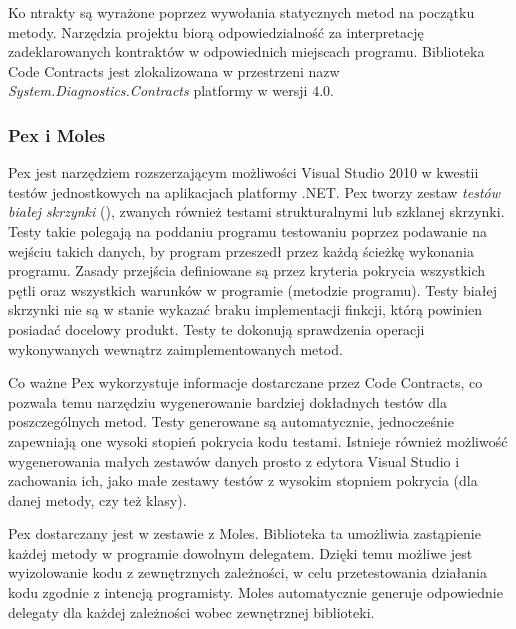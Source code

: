 Ko ntrakty są wyrażone poprzez wywołania statycznych metod na początku metody. Narzędzia projektu biorą odpowiedzialność za interpretację zadeklarowanych kontraktów w odpowiednich miejscach programu. Biblioteka Code Contracts jest zlokalizowana w przestrzeni nazw \emph{System.Diagnostics.Contracts} platformy w wersji $4.0$.

\subsubsection{Pex i Moles\label{04:pex}}
Pex jest narzędziem rozszerzającym możliwości Visual Studio 2010 w kwestii testów jednostkowych na aplikacjach platformy .NET. Pex tworzy zestaw \emph{testów białej skrzynki} (), zwanych również testami strukturalnymi lub szklanej skrzynki. Testy takie polegają na poddaniu programu testowaniu poprzez podawanie na wejściu takich danych, by program przeszedł przez każdą ścieżkę wykonania programu. Zasady przejścia definiowane są przez kryteria pokrycia wszystkich pętli oraz wszystkich warunków w programie (metodzie programu). Testy białej skrzynki nie są w stanie wykazać braku implementacji finkcji, którą powinien posiadać docelowy produkt. Testy te dokonują sprawdzenia operacji wykonywanych wewnątrz zaimplementowanych metod. 

Co ważne Pex wykorzystuje informacje dostarczane przez Code Contracts, co pozwala temu narzędziu wygenerowanie bardziej dokładnych testów dla poszczególnych metod. Testy generowane są automatycznie, jednocześnie zapewniają one wysoki stopień pokrycia kodu testami. Istnieje również możliwość wygenerowania małych zestawów danych prosto z edytora Visual Studio i zachowania ich, jako małe zestawy testów z wysokim stopniem pokrycia (dla danej metody, czy też klasy).

Pex dostarczany jest w zestawie z Moles. Biblioteka ta umożliwia zastąpienie każdej metody w programie dowolnym delegatem. Dzięki temu możliwe jest wyizolowanie kodu z zewnętrznych zależności, w celu przetestowania działania kodu zgodnie z intencją programisty. Moles automatycznie generuje odpowiednie delegaty dla każdej zależności wobec zewnętrznej biblioteki.